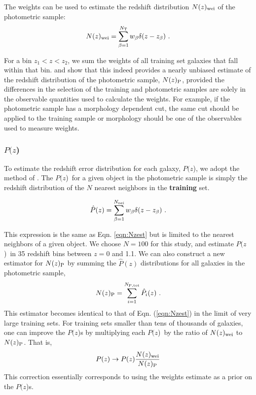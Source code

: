 \documentclass[preprint]{aastex}
\newcommand{\pofz}{$P(z$)}
\newcommand{\nwei}{N(z)_{\rm wei}}
\newcommand{\npz}{N(z)_{\rm P}}
\begin{document}
The weights can be used to estimate the redshift distribution $\nwei$ of the
photometric sample:
\begin{equation}  
\nwei = \sum_{\beta=1}^{N_{\rm T}} w_\beta \delta(z-z_\beta)~.
\label{eqn:Nzest}
\end{equation}

\noindent For a bin $z_1 < z < z_2$, we sum the weights of all training set
galaxies that fall within that bin.  \cite{LimaPhotoz08} and
\cite{CunhaPhotoz09} show that this indeed provides a nearly unbiased estimate
of the redshift distribution of the photometric sample, $N(z)_{\rm P}$,
provided the differences in the selection of the training and photometric
samples are solely in the observable quantities used to calculate the weights.
For example, if the photometric sample has a morphology dependent cut,
the same cut should be applied to the training sample or morphology should be one of
the observables used to measure weights.


\subsubsection{\pofz}

To estimate the redshift error distribution for each galaxy, \pofz,
we adopt the method of \cite{CunhaPhotoz09}. The \pofz\ for a given object in the
photometric sample is simply the redshift distribution of the $N$
nearest neighbors in the {\bf training} set.

\begin{equation}
\hat{P}(z) = \sum_{\beta=1}^{N_{\rm nei}} w_\beta \delta(z-z_\beta)~.
\label{eqn:pzest}
\end{equation}

\noindent This expression is the same as Eqn. \ref{eqn:Nzest} but is limited to
the nearest neighbors of a given object.  We choose $N=100$ for this study, and
estimate \pofz\ in 35 redshift bins between $z=0$ and 1.1.  We can also
construct a new estimator for $N(z)_{\rm P}$ by summing the $\hat{P}(z)$
distributions for all galaxies in the photometric sample,
\begin{equation}
\npz = \sum_{i=1}^{N_{\rm P,tot}}\hat{P}_i(z)~.
\label{eqn:Nhat2}
\end{equation}
\noindent This estimator becomes identical to that of Eqn. (\ref{eqn:Nzest})
in the limit of very large training sets.  For training sets smaller than tens
of thousands of galaxies, one can improve the \pofz s by multiplying each \pofz\ by the
ratio of $\nwei$ to $\npz$.
That is,
\begin{equation} \label{eq:pzcorrect}
P(z) \rightarrow P(z)\frac{\nwei}{\npz} \label{eqn:pzcorrect}
\end{equation}
This correction essentially corresponds to using the weights estimate as a
prior on the \pofz s.
\end{document}
